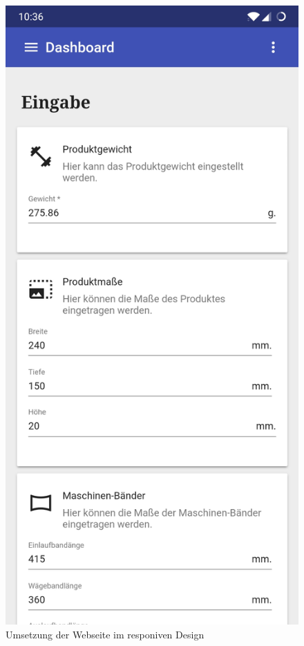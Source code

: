\begin{figure}[h]
    \centering
    \includegraphics[scale=0.14]{images/kapitel_4/website_smartphone.jpg}
    \caption{Umsetzung der Webseite im responiven Design}
    \label{fig:umsetzung_website_smartphone}
\end{figure}

